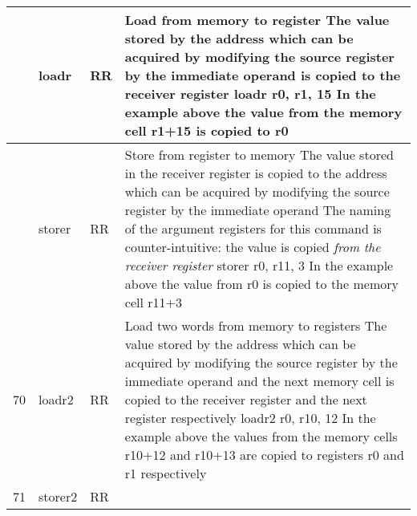 \documentclass{article}
\newcommand{\St}[1]{{\fontfamily{qcr}\selectfont #1}}
\newcommand{\Ss}[1]{{\fontfamily{cmss}\selectfont #1}}
\begin{document}
{\begin{table*}[h!]
\begin{tabular}{| >{\centering\arraybackslash} m{1cm} | >{\centering\arraybackslash} m{1.4cm} | >{\centering\arraybackslash} m{1.2cm} | m{11.6cm} |}
 \hline
 
 68 & \St{loadr} & \Ss{RR} &
 
 Load from memory to register \newline
 The value stored by the address which can be acquired by modifying the \newline
 source register by the immediate operand is copied to the receiver register \newline
 \St{loadr r0, r1, 15} \newline
 In the example above the value from the memory cell \St{r1+15} is copied to \St{r0} \\
 
 \hline
 
 69 & \St{storer} & \Ss{RR} &
 
 Store from register to memory \newline
 The value stored in the receiver register is copied to the address which can \newline
 be acquired by modifying the source register by the immediate operand \newline
 The naming of the argument registers for this command is counter-intuitive: \newline
 the value is copied \textit{from the receiver register} \newline
 \St{storer r0, r11, 3} \newline
 In the example above the value from \St{r0} is copied to the memory cell \St{r11+3} \\
 
 \hline
 
 70 & \St{loadr2} & \Ss{RR} &
 
 Load two words from memory to registers \newline
 The value stored by the address which can be acquired by modifying \newline
 the source register by the immediate operand and the next memory cell \newline
 is copied to the receiver register and the next register respectively \newline
 \St{loadr2 r0, r10, 12} \newline
 In the example above the values from the memory cells \St{r10+12} and \St{r10+13} \newline
 are copied to registers \St{r0} and \St{r1} respectively \\
 
 \hline
 
 71 & \St{storer2} & \Ss{RR} &
 

\end{tabular}
\end{table*}}
\end{document}
